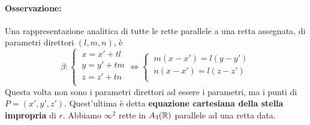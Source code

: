 
\paragraph{Osservazione:} Una rappresentazione analitica di tutte le rette parallele a una retta assegnata, di parametri direttori \((l,m,n)\), è \[
\beta : 
\begin{cases}
    \ x = x' + tl \\
    \ y = y' + tm \\
    \ z = z' + tn \\
\end{cases} \iff  
\begin{cases}
    \ m(x-x') = l(y-y') \\
    \ n(x-x') = l(z-z') \\
\end{cases}
\] Questa volta non sono i parametri direttori ad essere i parametri, ma i punti di \(P = (x', y', z')\). Quest'ultima è detta \textbf{equazione cartesiana della stella impropria} di \(r\). Abbiamo \(\infty^2\) rette in \(A_3(\RR )\) parallele ad una retta data.

